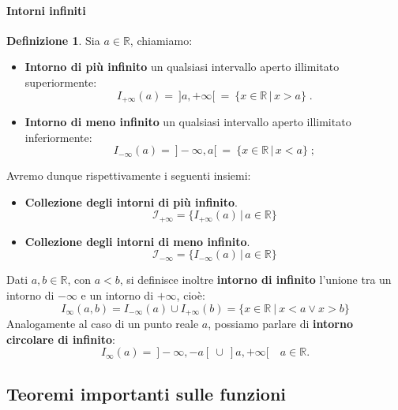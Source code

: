 \documentclass{article}
\theoremstyle{plain}
\theoremstyle{definition}
\newtheorem{defn}{Definizione}[section]
\theoremstyle{remark}
\begin{document}
\paragraph{Intorni infiniti}
\begin{bxthm}
\begin{defn}
    Sia $a\in\mathbb{R}$, chiamiamo:
    \begin{itemize}
        \item \textbf{Intorno di più infinito} un qualsiasi intervallo aperto illimitato superiormente:
        \[I_{+\infty}(a)= \ ]a , +\infty[ \ = \ \{x\in\mathbb{R} \,|\, x>a\}\;.\]
        \item \textbf{Intorno di meno infinito} un qualsiasi intervallo aperto illimitato inferiormente:
        \[I_{-\infty}(a)= \ ]-\infty , a[ \ = \ \{x\in\mathbb{R} \,|\, x<a\}\;;\]        
    \end{itemize}
    Avremo dunque rispettivamente i seguenti insiemi:
    \begin{itemize}
        \item \textbf{Collezione degli intorni di più infinito}.
        \[\mathcal{I}_{+\infty}=\{I_{+\infty}(a)\, |\, a\in\mathbb{R}\}\] 
        \item \textbf{Collezione degli intorni di meno infinito}.
        \[\mathcal{I}_{-\infty}=\{I_{-\infty}(a)\, |\, a\in\mathbb{R}\}\] 
    \end{itemize}  
    Dati $a,b\in\mathbb{R}$, con $a<b$, si definisce inoltre \textbf{intorno di infinito} l'unione tra un intorno di $-\infty$ e un intorno di $+\infty$, cioè:
    \[I_\infty(a,b)=I_{-\infty}(a)\cup I_{+\infty}(b)=\{x\in\mathbb{R}  \ | \ x<a\lor x>b\}\]
    Analogamente al caso di un punto reale $a$, possiamo parlare di \textbf{intorno circolare di infinito}: 
    \[I_\infty(a)= \ ]-\infty , -a[ \ \cup \ ]a , +\infty[\quad a\in\mathbb{R}.\]
\end{defn}
\end{bxthm}

\vspace{10pt}

\subsection{Teoremi importanti sulle funzioni}

\vspace{10pt}
\end{document}
